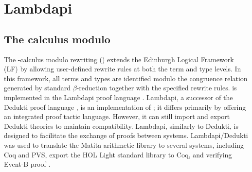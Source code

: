 \chapter{Lambdapi}\label{ch:intro-lambdapi}

\section{The \texorpdfstring{\lp } - calculus modulo}

The \lp-calculus modulo rewriting (\lpm)  extends the Edinburgh Logical Framework (LF) \cite{lf} by allowing user-defined rewrite rules at both the term and type levels.
In this framework, all terms and types are identified modulo the congruence relation generated by standard $\beta$-reduction together with the specified rewrite rules.
{\lpm} is implemented in the Lambdapi proof language \cite{lambdapi}. Lambdapi, a successor of the Dedukti proof language \cite{Dedukti-ref, Dedukti-ref2}, is an implementation of {\lpm}; it differs primarily by offering an integrated proof tactic language.
However, it can still import and export Dedukti theories to maintain compatibility. Lambdapi, similarly to Dedukti, is designed to facilitate the exchange of proofs between systems.
Lambdapi/Dedukti was used to translate \cite{thire:tel-03224039} the Matita arithmetic library to several systems, including Coq and PVS, export \cite{blanqui:hal-04613926} the HOL Light standard library to Coq,
and verifying Event-B proof \cite{eventb2lp}.


